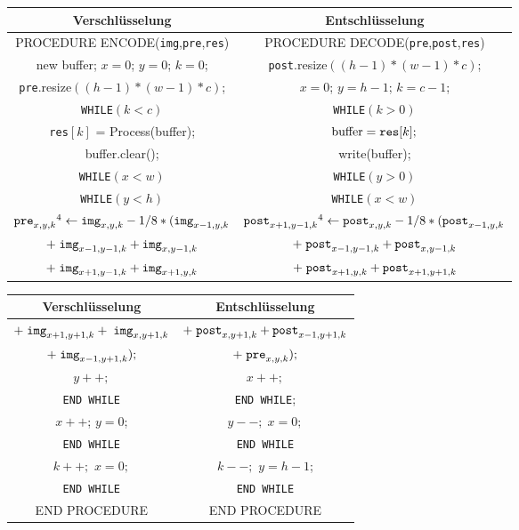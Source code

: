 \documentclass[a4paper,12pt]{article}
\begin{document}
\begin{tabular}{c|c}
Verschlüsselung & Entschlüsselung
\\
\hline
PROCEDURE ENCODE({\tt{img}},{\tt{pre}},{\tt{res}}) & PROCEDURE DECODE({\tt{pre}},{\tt{post}},{\tt{res}})
\\
new buffer; $x=0$; $y=0$; $k=0$; & {\tt{post}}.resize$((h-1)*(w-1)*c)$;
\\
{\tt{pre}}.resize$((h-1)*(w-1)*c)$; & $x=0$; $y=h-1$; $k=c-1$;
\\
{\tt{WHILE}}$(k < c)$ &                  {\tt{WHILE}}$(k > 0)$
\\
{\tt{res}}$[k]$ = Process(buffer); &  $\text{buffer} = \text{{\tt{res}}}[k];$
\\
buffer.clear(); & write(buffer);
\\
{\tt{WHILE}}$(x < w)$ &   {\tt{WHILE}}$(y > 0)$          
\\
{\tt{WHILE}}$(y < h)$ &   {\tt{WHILE}}$(x<w)$     
\\
$\text{{\tt{pre}}}_{x,y,k}\footnotemark[4]\leftarrow \text{{\tt{img}}}_{x,y,k} - 1/8 *(\text{{\tt{img}}}_{x-1,y,k}$ &  $\text{{\tt{post}}}_{x+1,y-1,k}\footnotemark[4]\leftarrow \text{{\tt{post}}}_{x,y,k} - 1/8 *(\text{{\tt{post}}}_{x-1,y,k} $ 
\\
$+\;\text{{\tt{img}}}_{x-1,y-1,k} + \text{{\tt{img}}}_{x,y-1,k}$ & $+\;\text{{\tt{post}}}_{x-1,y-1,k} + \text{{\tt{post}}}_{x,y-1,k}$  
\\
$+\;\text{{\tt{img}}}_{x+1,y-1,k} + \text{{\tt{img}}}_{x+1,y,k}$ & $+\;\text{{\tt{post}}}_{x+1,y,k} + \text{{\tt{post}}}_{x+1,y+1,k}  $
\end{tabular}
\par

\begin{center}
\begin{tabular}{c|c}
Verschlüsselung & Entschlüsselung
\\
\hline
 $+\;\text{{\tt{img}}}_{x+1,y+1,k} +\;\text{{\tt{img}}}_{x,y+1,k}$    &   $+\;\text{{\tt{post}}}_{x,y+1,k} + \text{{\tt{post}}}_{x-1,y+1,k} $
\\
$+\;\text{{\tt{img}}}_{x-1,y+1,k});$ & $+\;\text{{\tt{pre}}}_{x,y,k});$   
\\
$y++;$ & $x++;$
\\
{\tt{END {\tt{WHILE}}}}   & {\tt{END {\tt{WHILE}}}};
\\
$x++$; $y=0$;    & $y--;\;x=0;$  
\\
{\tt{END {\tt{WHILE}}}}   & {\tt{END {\tt{WHILE}}}} 
\\
$k++;$ $x=0;$  &  $k--;$ $y=h-1$;
\\
{\tt{END {\tt{WHILE}}}}    &   {\tt{END {\tt{WHILE}}}} 
\\
END PROCEDURE & END PROCEDURE
\end{tabular}
\end{center}
\end{document}
